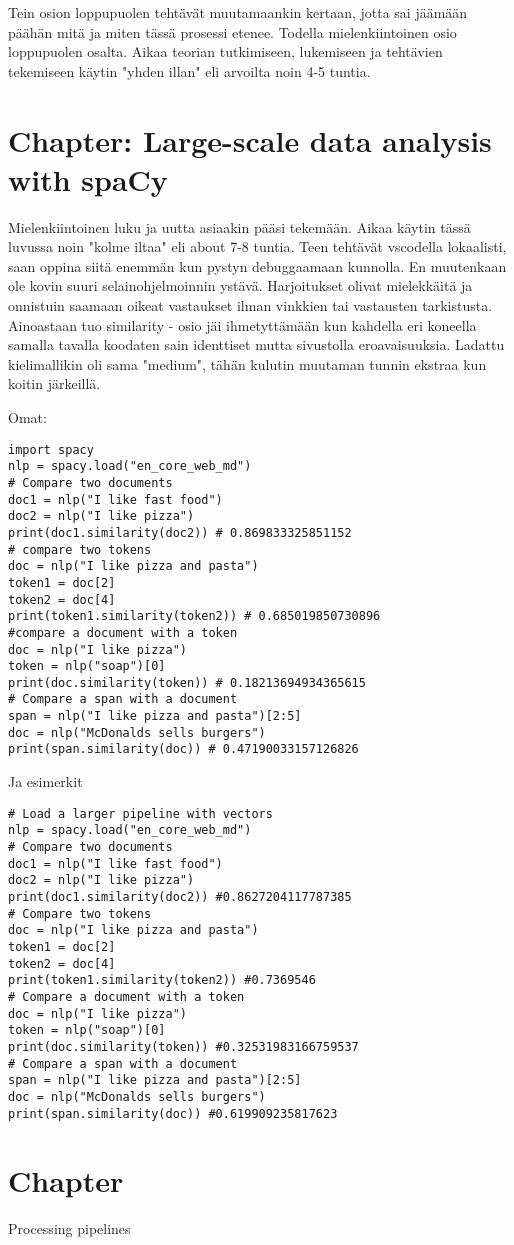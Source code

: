 \documentclass{article}
\begin{document}
Tein osion loppupuolen tehtävät muutamaankin kertaan, jotta sai jäämään päähän mitä ja miten tässä prosessi etenee. Todella mielenkiintoinen osio loppupuolen osalta. Aikaa teorian tutkimiseen, lukemiseen ja tehtävien tekemiseen käytin "yhden illan"  eli arvoilta noin 4-5 tuntia.

\section{Chapter: Large-scale data analysis with spaCy}



Mielenkiintoinen luku ja uutta asiaakin pääsi tekemään. Aikaa käytin tässä luvussa noin "kolme iltaa" eli about 7-8 tuntia.
 Teen tehtävät vscodella lokaalisti, saan oppina siitä enemmän kun pystyn debuggaamaan kunnolla. En muutenkaan ole kovin suuri selainohjelmoinnin ystävä. Harjoitukset olivat mielekkäitä ja onnistuin saamaan oikeat vastaukset ilman vinkkien tai vastausten tarkistusta. Ainoastaan tuo similarity - osio jäi ihmetyttämään kun kahdella eri koneella samalla tavalla koodaten sain identtiset mutta sivustolla eroavaisuuksia. Ladattu kielimallikin oli sama "medium", tähän kulutin muutaman tunnin ekstraa kun koitin järkeillä.

Omat:
\begin{lstlisting}
import spacy
nlp = spacy.load("en_core_web_md")
# Compare two documents
doc1 = nlp("I like fast food")
doc2 = nlp("I like pizza")
print(doc1.similarity(doc2)) # 0.869833325851152
# compare two tokens
doc = nlp("I like pizza and pasta")
token1 = doc[2]
token2 = doc[4]
print(token1.similarity(token2)) # 0.685019850730896
#compare a document with a token
doc = nlp("I like pizza")
token = nlp("soap")[0]
print(doc.similarity(token)) # 0.18213694934365615
# Compare a span with a document
span = nlp("I like pizza and pasta")[2:5]
doc = nlp("McDonalds sells burgers")
print(span.similarity(doc)) # 0.47190033157126826
\end{lstlisting}

Ja esimerkit
\begin{lstlisting}
# Load a larger pipeline with vectors
nlp = spacy.load("en_core_web_md")
# Compare two documents
doc1 = nlp("I like fast food")
doc2 = nlp("I like pizza")
print(doc1.similarity(doc2)) #0.8627204117787385
# Compare two tokens
doc = nlp("I like pizza and pasta")
token1 = doc[2]
token2 = doc[4]
print(token1.similarity(token2)) #0.7369546
# Compare a document with a token
doc = nlp("I like pizza")
token = nlp("soap")[0]
print(doc.similarity(token)) #0.32531983166759537
# Compare a span with a document
span = nlp("I like pizza and pasta")[2:5]
doc = nlp("McDonalds sells burgers")
print(span.similarity(doc)) #0.619909235817623
\end{lstlisting}

\section{Chapter} Processing pipelines
\end{document}

